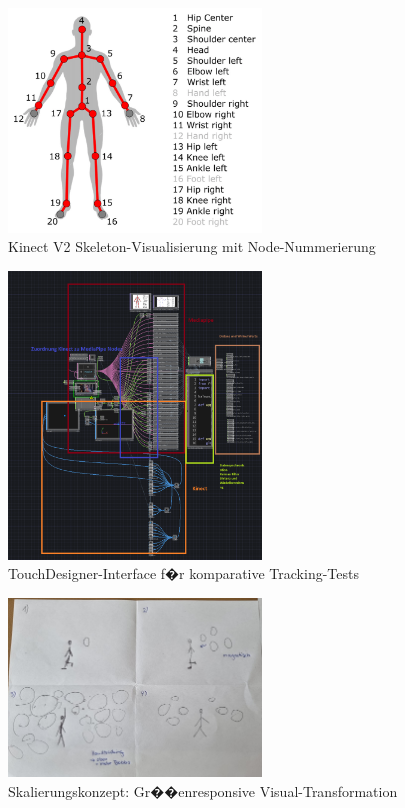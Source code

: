 \begin{figure}[!htbp]
    \centering
    \includegraphics[width=0.6\textwidth,height=0.25\textheight,keepaspectratio]{images/kinect_nodes.png}
    \caption{Kinect V2 Skeleton-Visualisierung mit Node-Nummerierung}
    \label{fig:kinect_nodes}
\end{figure}

\begin{figure}[!htbp]
    \centering
    \includegraphics[width=0.6\textwidth,height=0.25\textheight,keepaspectratio]{images/docupictures/KinectMediaPipe_Testing.png}
    \caption{TouchDesigner-Interface f�r komparative Tracking-Tests}
    \label{fig:testing_interface}
\end{figure}

\begin{figure}[!htbp]
    \centering
    \includegraphics[width=0.6\textwidth,height=0.25\textheight,keepaspectratio]{images/Sprint3_1.jpg}
    \caption{Skalierungskonzept: Gr��enresponsive Visual-Transformation}
    \label{fig:scaling_concept}
\end{figure}

